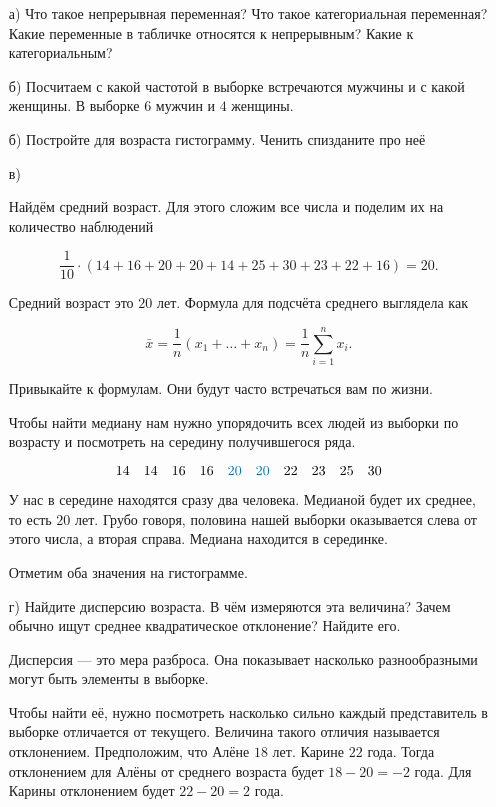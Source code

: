\documentclass[12pt, a4paper, oneside]{article}
\begin{document}
\begin{enumerate}
\item[а)] Что такое непрерывная переменная? Что такое категориальная переменная? Какие переменные в табличке относятся к непрерывным? Какие к категориальным? 

\item[б)]  Посчитаем с какой частотой в выборке встречаются мужчины и с какой женщины.  В выборке $6$ мужчин и $4$ женщины. 




\item[б)]  Постройте для возраста гистограмму.  Ченить спизданите про неё 

\item[в)] 

Найдём средний возраст. Для этого сложим все числа и поделим их на количество наблюдений

\[
\frac{1}{10} \cdot (14 + 16 + 20 + 20 + 14 + 25 + 30 + 23 + 22 + 16) = 20.
\]

Средний возраст это $20$ лет.  Формула для подсчёта среднего выглядела как 

\[
\bar x = \frac{1}{n} (x_1 + \ldots + x_n) = \frac{1}{n} \sum_{i=1}^n x_i.
\]

Привыкайте к формулам. Они будут часто встречаться вам по жизни. 

Чтобы найти медиану нам нужно упорядочить всех людей из выборки по возрасту и посмотреть на середину получившегося ряда. 

\[
14 \quad 14  \quad 16  \quad 16  \quad {\color{myblue}{20}}  \quad {\color{myblue}{20}}  \quad 22  \quad 23  \quad 25  \quad 30
\]

У нас в середине находятся сразу два человека. Медианой будет их среднее, то есть $20$ лет. Грубо говоря, половина нашей выборки оказывается слева от этого числа, а вторая справа. Медиана находится в серединке. 

Отметим оба значения на гистограмме. 




\item[г)] Найдите дисперсию возраста. В чём измеряются эта величина? Зачем обычно ищут среднее квадратическое отклонение? Найдите его. 

Дисперсия --- это мера разброса. Она показывает насколько разнообразными могут быть элементы в выборке. 

Чтобы найти её, нужно посмотреть насколько сильно каждый представитель в выборке отличается от текущего. Величина такого отличия называется отклонением. Предположим, что Алёне $18$ лет. Карине $22$ года. Тогда отклонением для Алёны от среднего возраста будет $18 - 20 = -2$ года. Для Карины отклонением будет $22 - 20 = 2$ года. 


\end{enumerate}
\end{document}
